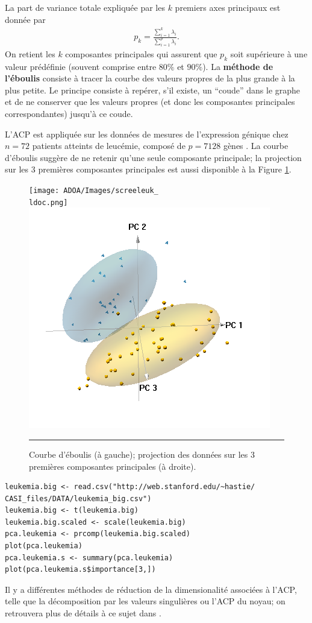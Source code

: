 \newl La part de variance totale expliquée par les $k$ premiers axes principaux est donnée par
\begin{align*}
p_k=\frac{\sum_{i=1}^{k} \lambda_i}{\sum_{i=1}^{p}\lambda_i}.
\end{align*}
On retient les $k$ composantes principales qui assurent que $p_k$  soit supérieure à une valeur prédéfinie (souvent comprise entre $80\%$ et $90\%$). \newl
La \textbf{méthode de l'éboulis} consiste à tracer la courbe des valeurs propres de la plus grande \`a la plus petite. Le principe consiste à repérer, s'il existe, un ``coude'' dans le graphe et de ne conserver que les valeurs propres (et donc les composantes principales correspondantes) jusqu'à ce coude.
\begin{Exemple}
L'ACP est appliquée sur les donn\'ees de mesures de l'expression génique chez $n=72$ patients atteints de leucémie, compos\'e de $p=7128$ gènes \cite{Hleukemia}. La courbe d'\'eboulis sugg\`ere de ne retenir qu'une seule  composante principale; la projection sur les 3 premi\`eres composantes principales est aussi disponible \`a la Figure \ref{fig0}.
\begin{figure}[t]
    \centering
     \texttt{[image: ADOA/Images/screeleuk\_\\ldoc.png]}
    \includegraphics[width=.4\textwidth]{ADOA/Images/3dpcleuk.PNG}
    \caption{Courbe d'éboulis (\`a gauche); projection des données sur les 3 premi\`eres composantes principales (\`a droite).}\hrule
    \label{fig0}
\end{figure}
\begin{lstlisting}
leukemia.big <- read.csv("http://web.stanford.edu/~hastie/ CASI_files/DATA/leukemia_big.csv")
leukemia.big <- t(leukemia.big)
leukemia.big.scaled <- scale(leukemia.big)
pca.leukemia <- prcomp(leukemia.big.scaled)
plot(pca.leukemia)
pca.leukemia.s <- summary(pca.leukemia) 
plot(pca.leukemia.s$importance[3,])
\end{lstlisting}
\end{Exemple}
\noindent Il y a diff\'erentes  m\'ethodes de r\'eduction de la dimensionalit\'e associ\'ees \`a l'ACP, telle que la d\'ecomposition par les valeurs singuli\`eres ou l'ACP du noyau; on retrouvera plus de d\'etails \`a ce sujet dans \cite{BLMMP}.
